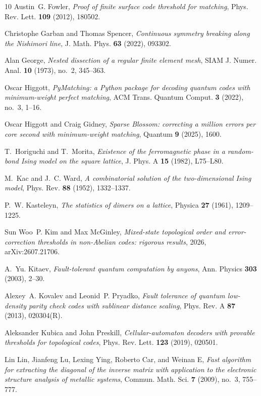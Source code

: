 \documentclass[11pt]{amsart}
\theoremstyle{definition}
\theoremstyle{remark}
\numberwithin{equation}{section}
\begin{document}
\begin{thebibliography}{10}
Austin~G. Fowler, \emph{Proof of finite surface code threshold for matching},
  Phys. Rev. Lett. \textbf{109} (2012), 180502.

Christophe Garban and Thomas Spencer, \emph{Continuous symmetry breaking along
  the {N}ishimori line}, J. Math. Phys. \textbf{63} (2022), 093302.

Alan George, \emph{Nested dissection of a regular finite element mesh}, SIAM J.
  Numer. Anal. \textbf{10} (1973), no.~2, 345--363.

Oscar Higgott, \emph{{PyMatching}: a {P}ython package for decoding quantum
  codes with minimum-weight perfect matching}, ACM Trans. Quantum Comput.
  \textbf{3} (2022), no.~3, 1--16.

Oscar Higgott and Craig Gidney, \emph{Sparse {B}lossom: correcting a million
  errors per core second with minimum-weight matching}, Quantum \textbf{9}
  (2025), 1600.

T.~Horiguchi and T.~Morita, \emph{Existence of the ferromagnetic phase in a
  random-bond {I}sing model on the square lattice}, J. Phys. A \textbf{15}
  (1982), L75--L80.

M.~Kac and J.~C. Ward, \emph{A combinatorial solution of the two-dimensional
  {I}sing model}, Phys. Rev. \textbf{88} (1952), 1332--1337.

P.~W. Kasteleyn, \emph{The statistics of dimers on a lattice}, Physica
  \textbf{27} (1961), 1209--1225.

Sun Woo~P. Kim and Max McGinley, \emph{Mixed-state topological order and
  error-correction thresholds in non-{A}belian codes: rigorous results}, 2026,
  arXiv:2607.21706.

A.~Yu. Kitaev, \emph{Fault-tolerant quantum computation by anyons}, Ann.
  Physics \textbf{303} (2003), 2--30.

Alexey~A. Kovalev and Leonid~P. Pryadko, \emph{Fault tolerance of quantum
  low-density parity check codes with sublinear distance scaling}, Phys. Rev. A
  \textbf{87} (2013), 020304(R).

Aleksander Kubica and John Preskill, \emph{Cellular-automaton decoders with
  provable thresholds for topological codes}, Phys. Rev. Lett. \textbf{123}
  (2019), 020501.

Lin Lin, Jianfeng Lu, Lexing Ying, Roberto Car, and Weinan E, \emph{Fast
  algorithm for extracting the diagonal of the inverse matrix with application
  to the electronic structure analysis of metallic systems}, Commun. Math. Sci.
  \textbf{7} (2009), no.~3, 755--777.


\end{thebibliography}
\end{document}
